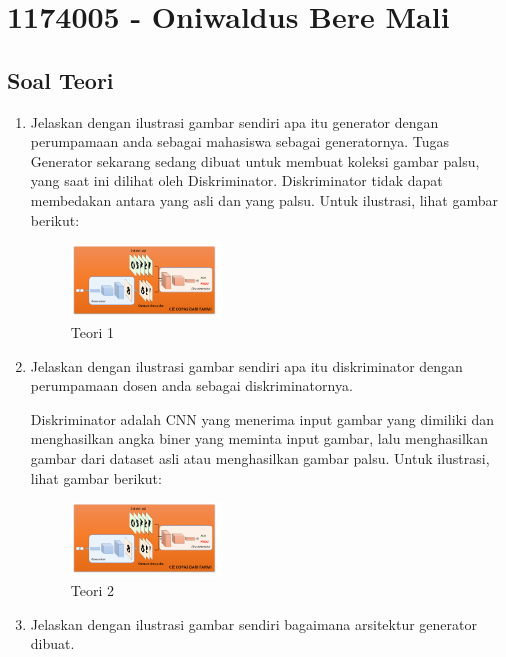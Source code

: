\section{1174005 - Oniwaldus Bere Mali}
\subsection{Soal Teori}
\begin{enumerate}

	\item Jelaskan dengan ilustrasi gambar sendiri apa itu generator dengan perumpamaan anda sebagai mahasiswa sebagai generatornya.
	\hfill\break
	Tugas Generator sekarang sedang dibuat untuk membuat koleksi gambar palsu, yang saat ini dilihat oleh Diskriminator. Diskriminator tidak dapat membedakan antara yang asli dan yang palsu. Untuk ilustrasi, lihat gambar berikut: 

	\begin{figure}[H]
	\centering
		\includegraphics[width=4cm]{figures/1174005/tugas8/materi/teori1,2.PNG}
		\caption{Teori 1}
	\end{figure}

	\item Jelaskan dengan ilustrasi gambar sendiri apa itu diskriminator dengan perumpamaan dosen anda sebagai diskriminatornya.

	\hfill\break
	Diskriminator adalah CNN yang menerima input gambar yang dimiliki dan menghasilkan angka biner yang meminta input gambar, lalu menghasilkan gambar dari dataset asli atau menghasilkan gambar palsu. Untuk ilustrasi, lihat gambar berikut: 

	\begin{figure}[H]
	\centering
		\includegraphics[width=4cm]{figures/1174005/tugas8/materi/teori1,2.PNG}
		\caption{Teori 2}
	\end{figure}
	
	\item Jelaskan dengan ilustrasi gambar sendiri bagaimana arsitektur generator dibuat.


\end{enumerate}
